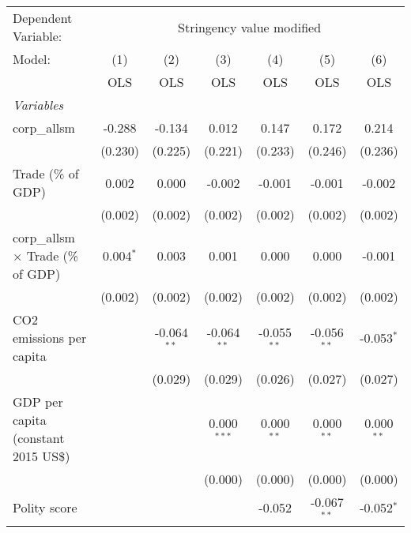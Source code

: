 
\begingroup
\centering
\begin{tabular}{lcccccc}
   \toprule
   Dependent Variable: & \multicolumn{6}{c}{Stringency value modified}\\
   Model:                                    & (1)         & (2)           & (3)           & (4)           & (5)           & (6)\\  
                                             &  OLS        & OLS           & OLS           & OLS           & OLS           & OLS\\  
   \midrule
   \emph{Variables}\\
   corp\_allsm                               & -0.288      & -0.134        & 0.012         & 0.147         & 0.172         & 0.214\\   
                                             & (0.230)     & (0.225)       & (0.221)       & (0.233)       & (0.246)       & (0.236)\\   
   Trade (\% of GDP)                         & 0.002       & 0.000         & -0.002        & -0.001        & -0.001        & -0.002\\   
                                             & (0.002)     & (0.002)       & (0.002)       & (0.002)       & (0.002)       & (0.002)\\   
   corp\_allsm $\times$ Trade (\% of GDP)    & 0.004$^{*}$ & 0.003         & 0.001         & 0.000         & 0.000         & -0.001\\   
                                             & (0.002)     & (0.002)       & (0.002)       & (0.002)       & (0.002)       & (0.002)\\   
   CO2 emissions per capita                  &             & -0.064$^{**}$ & -0.064$^{**}$ & -0.055$^{**}$ & -0.056$^{**}$ & -0.053$^{*}$\\   
                                             &             & (0.029)       & (0.029)       & (0.026)       & (0.027)       & (0.027)\\   
   GDP per capita (constant 2015 US\$)       &             &               & 0.000$^{***}$ & 0.000$^{**}$  & 0.000$^{**}$  & 0.000$^{**}$\\   
                                             &             &               & (0.000)       & (0.000)       & (0.000)       & (0.000)\\   
   Polity score                              &             &               &               & -0.052        & -0.067$^{**}$ & -0.052$^{*}$\\   

\end{tabular}
